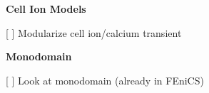 {\bfseries{Cell Ion Models}}
\begin{DoxyItemize}
\item \mbox{[} \mbox{]} Modularize cell ion/calcium transient ~\newline

\end{DoxyItemize}

{\bfseries{Monodomain}}
\begin{DoxyItemize}
\item \mbox{[} \mbox{]} Look at monodomain (already in F\+Eni\+CS) ~\newline
 
\end{DoxyItemize}